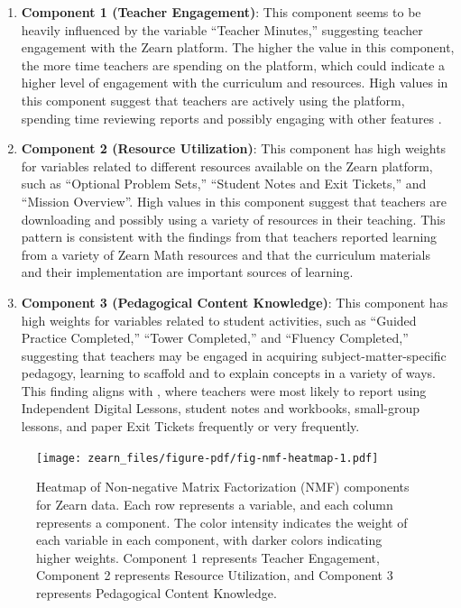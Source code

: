 \documentclass[
  number,
  preprint,
  3p,
  onecolumn]{elsarticle}
\begin{document}
\begin{enumerate}
\def\labelenumi{\arabic{enumi}.}
\item
  \textbf{Component 1 (Teacher Engagement)}: This component seems to be
  heavily influenced by the variable ``Teacher Minutes,'' suggesting
  teacher engagement with the Zearn platform. The higher the value in
  this component, the more time teachers are spending on the platform,
  which could indicate a higher level of engagement with the curriculum
  and resources. High values in this component suggest that teachers are
  actively using the platform, spending time reviewing reports and
  possibly engaging with other features \citep{morrison2019a}.
\item
  \textbf{Component 2 (Resource Utilization)}: This component has high
  weights for variables related to different resources available on the
  Zearn platform, such as ``Optional Problem Sets,'' ``Student Notes and
  Exit Tickets,'' and ``Mission Overview''. High values in this
  component suggest that teachers are downloading and possibly using a
  variety of resources in their teaching. This pattern is consistent
  with the findings from \citep{knudsen2020a} that teachers reported
  learning from a variety of Zearn Math resources and that the
  curriculum materials and their implementation are important sources of
  learning.
\item
  \textbf{Component 3 (Pedagogical Content Knowledge)}: This component
  has high weights for variables related to student activities, such as
  ``Guided Practice Completed,'' ``Tower Completed,'' and ``Fluency
  Completed,'' suggesting that teachers may be engaged in acquiring
  subject-matter-specific pedagogy, learning to scaffold and to explain
  concepts in a variety of ways. This finding aligns with
  \citep{morrison2019a}, where teachers were most likely to report using
  Independent Digital Lessons, student notes and workbooks, small-group
  lessons, and paper Exit Tickets frequently or very frequently.
\end{enumerate}

\begin{figure}

{\centering \texttt{[image: zearn\_files/figure-pdf/fig-nmf-heatmap-1.pdf]}

}

\caption{\label{fig-nmf-heatmap}Heatmap of Non-negative Matrix
Factorization (NMF) components for Zearn data. Each row represents a
variable, and each column represents a component. The color intensity
indicates the weight of each variable in each component, with darker
colors indicating higher weights. Component 1 represents Teacher
Engagement, Component 2 represents Resource Utilization, and Component 3
represents Pedagogical Content Knowledge.}

\end{figure}
\end{document}
